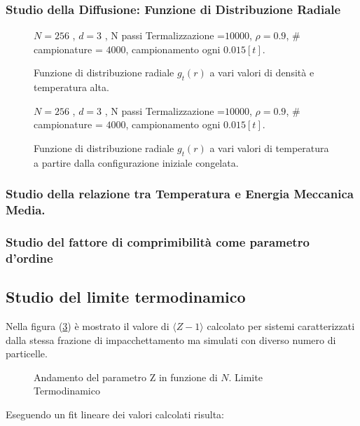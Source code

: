 \documentclass[11pt]{article}
\theoremstyle{plain}
\theoremstyle{remark}
\begin{document}
\subsubsection{Studio della Diffusione: Funzione di Distribuzione Radiale}

	\begin{figure}
		\centering
		\caption[Sfere Soffici$/$Problema11_v2.cpp]{Funzione di distribuzione radiale $g_t(r)$ a vari valori di densità e temperatura alta.}\label{fig: Problema11_v2a}

		\centering  \footnotesize{$N= 256$ , $d=3$ , N passi Termalizzazione =$ 10000$, $\rho = 0.9$, # campionature = $ 4000$, campionamento ogni $0.015 [t]$.}
	\end{figure}

	\begin{figure}
		\centering
		\caption[Sfere Soffici$/$Problema11_v2.cpp]{Funzione di distribuzione radiale $g_t(r)$ a vari valori di temperatura a partire dalla configurazione iniziale congelata.}\label{fig: Problema11_v2b}


		\centering  \footnotesize{$N= 256$ , $d=3$ , N passi Termalizzazione =$ 10000$, $\rho = 0.9$, # campionature = $ 4000$, campionamento ogni $0.015 [t]$.}
	\end{figure}


\subsubsection{Studio della relazione tra Temperatura e Energia Meccanica Media.}


\subsubsection{Studio del fattore di comprimibilità come parametro d'ordine}


\clearpage
\subsection{Studio del limite termodinamico}
Nella figura (\ref{fig: Limite Termo}) è mostrato il valore di $\langle Z-1 \rangle$  calcolato per sistemi caratterizzati dalla stessa frazione di impacchettamento ma simulati con diverso numero di particelle.

\begin{figure}[htbp]
\centering
	\caption[Sfere Rigide$/$Problema8.cpp]{Andamento del parametro Z in funzione di $N$. Limite Termodinamico }
	\label{fig: Limite Termo}
\end{figure}
Eseguendo un fit lineare dei valori calcolati risulta:
\end{document}
